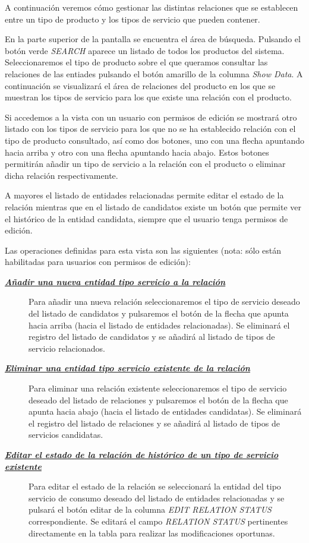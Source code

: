 A continuación veremos cómo gestionar las distintas relaciones que se establecen entre un tipo de producto y los tipos de servicio que pueden contener.


En la parte superior de la pantalla se encuentra el área de búsqueda. Pulsando el botón verde \emph{SEARCH} aparece un listado de todos los productos del sistema. Seleccionaremos el tipo de producto sobre el que queramos consultar las relaciones de las entiades pulsando el botón amarillo de la columna \emph{Show Data}. A continuación se visualizará el área de relaciones del producto en los que se muestran los tipos de servicio para los que existe una relación con el producto.

Si accedemos a la vista con un usuario con permisos de edición se mostrará otro listado con los tipos de servicio para los que no se ha establecido relación con el tipo de producto consultado, así como dos botones, uno con una flecha apuntando hacia arriba y otro con una flecha apuntando hacia abajo. Estos botones permitirán añadir un tipo de servicio a la relación con el producto o eliminar dicha relación respectivamente. 

A mayores el listado de entidades relacionadas permite editar el estado de la relación mientras que en el listado de candidatos existe un botón que permite ver el histórico de la entidad candidata, siempre que el usuario tenga permisos de edición.


Las operaciones definidas para esta vista son las siguientes (nota: sólo están habilitadas para usuarios con permisos de edición):
\begin{description}
\item[\underline{\textsl{\textbf{Añadir una nueva entidad tipo servicio a la relación}}}] Para añadir una nueva relación seleccionaremos el tipo de servicio deseado del listado de candidatos y pulsaremos el botón de la flecha que apunta hacia arriba (hacia el listado de entidades relacionadas). Se eliminará el registro del listado de candidatos y se añadirá al listado de tipos de servicio relacionados.

\item[\underline{\textsl{\textbf{Eliminar una entidad tipo servicio existente de la relación}}}] Para eliminar una relación existente seleccionaremos el tipo de servicio deseado del listado de relaciones y pulsaremos el botón de la flecha que apunta hacia abajo (hacia el listado de entidades candidatas). Se eliminará el registro del listado de relaciones y se añadirá al listado de tipos de servicios candidatas.

\item[\underline{\textsl{\textbf{Editar el estado de la relación de histórico de un tipo de servicio existente}}}] Para editar el estado de la relación se seleccionará la entidad del tipo servicio de consumo deseado del listado de entidades relacionadas y se pulsará el botón editar de la columna \textit{EDIT RELATION STATUS} correspondiente. Se editará el campo \emph{RELATION STATUS} pertinentes directamente en la tabla para realizar las modificaciones oportunas.
\end{description}



